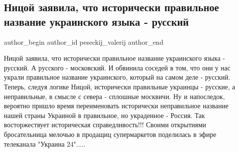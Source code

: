  
 
 
 
 
 
\subsection{Ницой заявила, что исторически правильное название украинского языка - русский}
\label{sec:05_08_2021.fb.peseckij_valerij.1.nicoj_mova_jazyk}
 
\ifcmt
 author_begin
   author_id peseckij_valerij
 author_end
\fi

Ницой заявила, что исторически правильное название украинского языка - русский.
А русского - московский. И обвинила соседей в том, что они у нас украли
правильное название украинского, который на самом деле - русский. Теперь,
следуя логике Ницой, исторически правильные украинцы - русские, а неправильные,
в смысле с севера - сплошные москвичи. Ну и напоследок, вероятно пришло время
переименовать исторически неправильное название нашей страны Украиной в
правильное, но украденное - Россия. Так восторжествует историческая
справедливость!!! Своими открытиями бросательница мелочью в продащиц
супермаркетов поделилась в эфире телеканала "Украина 24".....


